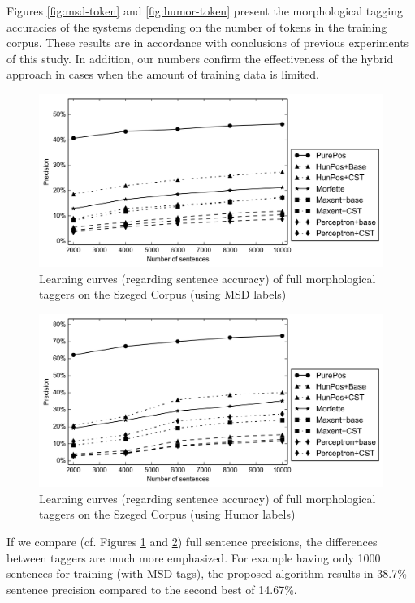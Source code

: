 Figures \ref{fig:msd-token} and \ref{fig:humor-token} present the morphological tagging accuracies of the systems depending on the number of tokens in the training corpus. 
These results are in accordance with conclusions of previous experiments of this study. 
In addition, our numbers confirm the effectiveness of the hybrid approach in cases when the amount of training data is limited.  

\begin{figure}[H]
  \centering
  \includegraphics[width=1\textwidth]{MorphTagging/msd_sent.png} 
  \caption{Learning curves (regarding sentence accuracy) of full morphological taggers on the Szeged Corpus (using MSD labels)}
  \label{fig:msd-sent}
\end{figure}

\begin{figure}[H]
  \centering
  \includegraphics[width=1\textwidth]{MorphTagging/humor_sent.png}
  \caption{Learning curves (regarding sentence accuracy) of full morphological taggers on the Szeged Corpus (using Humor labels)}
  \label{fig:humor-sent}
\end{figure}

If we compare (cf. Figures \ref{fig:msd-sent} and \ref{fig:humor-sent}) full sentence precisions, the differences between taggers are much more emphasized. 
For example having only 1000 sentences for training (with MSD tags), the proposed algorithm results in 38.7\% sentence precision compared to the second best of 14.67\%.

